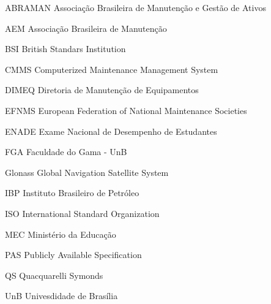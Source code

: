 \begin{siglas}
  \item[ABRAMAN] Associação Brasileira de Manutenção e Gestão de Ativos
  \item[AEM] Associação Brasileira de Manutenção
  \item[BSI] British Standars Institution
  \item[CMMS] Computerized Maintenance Management System
  \item[DIMEQ] Diretoria de Manutenção de Equipamentos
  \item[EFNMS] European Federation of National Maintenance Societies 
  \item[ENADE] Exame Nacional de Desempenho de Estudantes
  \item[FGA] Faculdade do Gama - UnB
  \item[Glonass] Global Navigation Satellite System
  \item[IBP] Instituto Brasileiro de Petróleo
  \item[ISO] International Standard Organization
  \item[MEC] Ministério da Educação
  \item[PAS] Publicly Available Specification
  \item[QS] Quacquarelli Symonds
  \item[UnB] Univesdidade de Brasília
\end{siglas}
